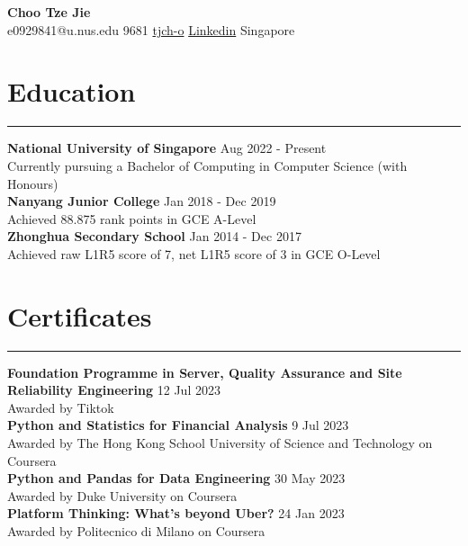 \documentclass[letterpaper,11pt]{article}
\begin{document}
    {\fontsize{15}{20}\selectfont \textbf{Choo Tze Jie}}
    \\
    \faEnvelope\space e0929841@u.nus.edu 
    \faMobile{} 9681
    \faGithub\space \href{https://github.com/tjch-o}{tjch-o} 
    \faLinkedin\space \href{https://www.linkedin.com/in/tze-jie-choo/}{Linkedin}
    \faMapMarker\space Singapore
     
    \section{Education}
    \vspace{-0.5em} 
    \hrule
    \vspace{0.5em}
    \textbf{National University of Singapore} \hfill Aug 2022 - Present
    \\
    Currently pursuing a Bachelor of Computing in Computer Science (with Honours)
    \\
    \vspace{0.5em}
    \textbf{Nanyang Junior College}  \hfill Jan 2018 - Dec 2019
    \\
    Achieved 88.875 rank points in GCE A-Level 
    \\
    \vspace{0.5em}
    \textbf{Zhonghua Secondary School} \hfill Jan 2014 - Dec 2017
    \\
    Achieved raw L1R5 score of 7, net L1R5 score of 3 in GCE O-Level
     
    \section{Certificates}
    \vspace{-0.5em}
    \hrule
    \vspace{0.5em}
    \textbf{Foundation Programme in Server, Quality Assurance and Site Reliability Engineering} 
    \hfill 12 Jul 2023
    \\
    Awarded by Tiktok
    \\
    \vspace{0.5em}
    \textbf{Python and Statistics for Financial Analysis} \hfill 9 Jul 2023
    \\
    Awarded by The Hong Kong School University of Science and Technology on Coursera
    \\
    \vspace{0.5em}
    \textbf{Python and Pandas for Data Engineering} \hfill 30 May 2023
    \\
    Awarded by Duke University on Coursera
    \\
    \vspace{0.5em}
    \textbf{Platform Thinking: What's beyond Uber?} \hfill 24 Jan 2023
    \\
    Awarded by Politecnico di Milano on Coursera
     
\end{document}

